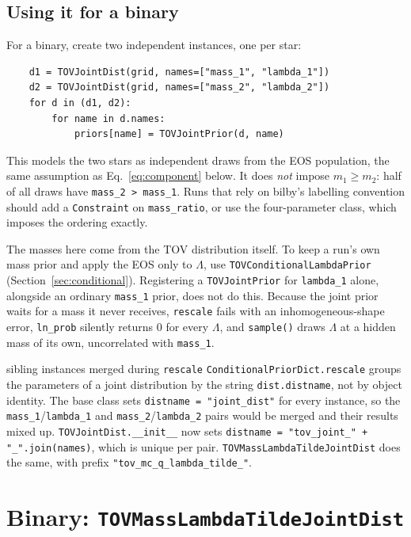 \documentclass[11pt,a4paper]{article}
\newcommand{\code}[1]{\texttt{#1}}
\begin{document}
\subsection{Using it for a binary}
\label{sec:pairs}

For a binary, create two independent instances, one per star:
\begin{verbatim}
    d1 = TOVJointDist(grid, names=["mass_1", "lambda_1"])
    d2 = TOVJointDist(grid, names=["mass_2", "lambda_2"])
    for d in (d1, d2):
        for name in d.names:
            priors[name] = TOVJointPrior(d, name)
\end{verbatim}
This models the two stars as independent draws from the EOS population, the
same assumption as Eq.~\eqref{eq:component} below. It does \emph{not} impose
$m_1 \ge m_2$: half of all draws have \code{mass\_2 > mass\_1}. Runs that rely
on bilby's labelling convention should add a \code{Constraint} on
\code{mass\_ratio}, or use the four-parameter class, which imposes the ordering
exactly.

The masses here come from the TOV distribution itself. To keep a run's own mass
prior and apply the EOS only to $\Lambda$, use
\code{TOVConditionalLambdaPrior} (Section~\ref{sec:conditional}). Registering
a \code{TOVJointPrior} for \code{lambda\_1} alone, alongside an ordinary
\code{mass\_1} prior, does not do this. Because the joint prior waits for a mass
it never receives, \code{rescale} fails with an inhomogeneous-shape error,
\code{ln\_prob} silently returns $0$ for every $\Lambda$, and \code{sample()}
draws $\Lambda$ at a hidden mass of its own, uncorrelated with \code{mass\_1}.

\begin{bugnote}{sibling instances merged during \code{rescale}}
\code{ConditionalPriorDict.rescale} groups the parameters of a joint
distribution by the string \code{dist.distname}, not by object identity. The
base class sets \code{distname = "joint\_dist"} for every instance, so the
\code{mass\_1}/\code{lambda\_1} and \code{mass\_2}/\code{lambda\_2} pairs would
be merged and their results mixed up. \code{TOVJointDist.\_\_init\_\_} now sets
\code{distname = "tov\_joint\_" + "\_".join(names)}, which is unique per pair.
\code{TOVMassLambdaTildeJointDist} does the same, with prefix
\code{"tov\_mc\_q\_lambda\_tilde\_"}.
\end{bugnote}

\section{Binary: \code{TOVMassLambdaTildeJointDist}}
\label{sec:binary}
\end{document}
